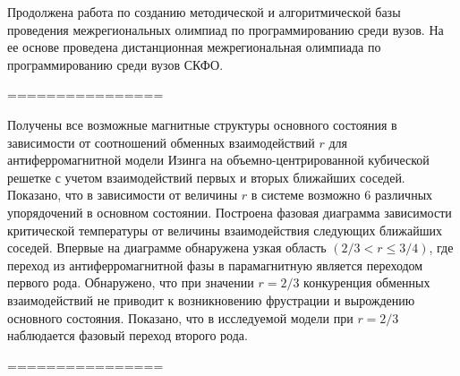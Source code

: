 Продолжена работа по созданию методической и алгоритмической базы проведения межрегиональных олимпиад по программированию среди вузов. На ее основе проведена дистанционная межрегиональная олимпиада по программированию среди вузов СКФО.


================



Получены все возможные магнитные структуры основного состояния в зависимости от соотношений обменных взаимодействий $r$ для антиферромагнитной модели Изинга на объемно-центрированной кубической решетке с учетом взаимодействий первых и вторых ближайших соседей. Показано, что в зависимости от величины $r$ в системе возможно $6$ различных упорядочений в основном состоянии. Построена фазовая диаграмма зависимости критической температуры от величины взаимодействия следующих ближайших соседей. Впервые на диаграмме обнаружена узкая область $(2/3<r \leq 3/4)$, где переход из антиферромагнитной фазы в парамагнитную является переходом первого рода. Обнаружено, что при значении $r=2/3$ конкуренция обменных взаимодействий не приводит к возникновению фрустрации и вырождению основного состояния. Показано, что в исследуемой модели при $r = 2/3$ наблюдается фазовый переход второго рода.


================























%
%
%
%


